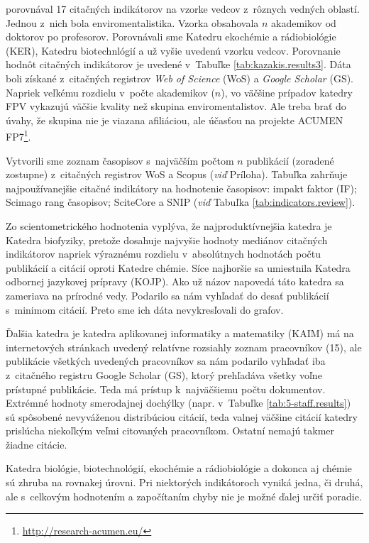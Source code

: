 \citet{Wildgaard2015} porovnával 17 citačných indikátorov na vzorke vedcov
z~rôznych vedných oblastí. Jednou z~nich bola enviromentalistika. Vzorka
obsahovala $n$ akademikov od doktorov po profesorov. Porovnávali sme Katedru
ekochémie a rádiobiológie (KER), Katedru biotechnlógií a už vyšie uvedenú vzorku
vedcov.  Porovnanie hodnôt citačných indikátorov je uvedené v~Tabuľke
\ref{tab:kazakis.results3}.  Dáta boli získané z~citačných registrov \emph{Web of
Science} (WoS) a \emph{Google Scholar} (GS).  Napriek veľkému rozdielu v~počte
akademikov ($n$), vo väčšine prípadov katedry FPV vykazujú väčšie kvality než
skupina enviromentalistov. Ale treba brať do úvahy, že skupina nie je viazana
afiliáciou, ale účasťou na projekte ACUMEN
FP7\footnote{\url{http://research-acumen.eu/}}.

Vytvorili sme zoznam časopisov s~najväčším počtom $n$ publikácií (zoradené
zostupne) z~citačných registrov WoS a Scopus (\emph{viď} Príloha).  Tabuľka zahrňuje
najpoužívanejšie citačné indikátory na hodnotenie časopisov: impakt faktor
(IF); Scimago rang časopisov; SciteCore a SNIP (\emph{viď} Tabuľka
\ref{tab:indicators.review}).

Zo scientometrického hodnotenia vyplýva, že najproduktívnejšia katedra je
Katedra biofyziky, pretože dosahuje najvyšie hodnoty mediánov citačných
indikátorov napriek výraznému rozdielu v~absolútnych hodnotách počtu publikácií
a citácií oproti Katedre chémie. Síce najhoršie sa umiestnila Katedra odbornej
jazykovej prípravy (KOJP). Ako už názov napovedá táto katedra sa zameriava na
prírodné vedy. Podarilo sa nám vyhľadať do desať publikácií s~minimom citácií.
Preto sme ich dáta nevykresľovali do grafov.

Ďalšia katedra je katedra aplikovanej informatiky a matematiky (KAIM) má na
internetových stránkach uvedený relatívne rozsiahly zoznam pracovníkov (15),
ale publikácie všetkých uvedených pracovníkov sa nám podarilo vyhľadať iba
z~citačného registru Google Scholar (GS), ktorý prehľadáva všetky voľne prístupné
publikácie. Teda má prístup k~najväčšiemu počtu dokumentov. Extrémné hodnoty
smerodajnej dochýlky (napr. v~Tabuľke \ref{tab:5-staff.results}) sú spôsobené
nevyváženou distribúciou citácií, teda valnej väčšine citácií katedry prislúcha
niekoľkým veľmi citovaných pracovníkom. Ostatní nemajú takmer žiadne citácie.

Katedra biológie, biotechnológií, ekochémie a rádiobiológie a dokonca aj chémie
sú zhruba na rovnakej úrovni. Pri niektorých indikátoroch vyniká jedna, či
druhá, ale s~celkovým hodnotením a započítaním chyby nie je možné ďalej určiť
poradie.

